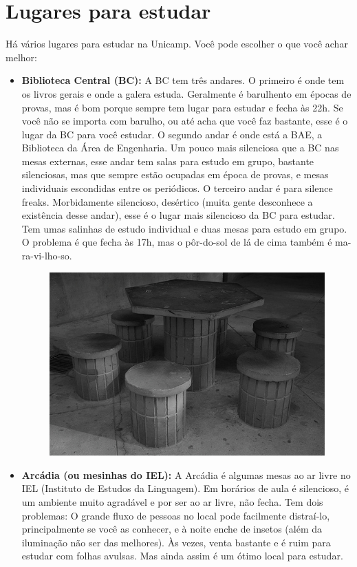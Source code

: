 
\section{Lugares para estudar}

Há vários lugares para estudar na Unicamp. Você pode escolher o que você achar
melhor:

\begin{itemize}
    \item  \textbf{Biblioteca Central (BC):} A BC tem três andares. O primeiro é
        onde tem os livros gerais e onde a galera estuda. Geralmente é
        barulhento em épocas de provas, mas é bom porque sempre tem lugar para
        estudar e fecha às 22h.  Se você não se importa com barulho, ou até acha
        que você faz bastante, esse é o lugar da BC para você estudar. O segundo
        andar é onde está a BAE, a Biblioteca da Área de Engenharia. Um pouco
        mais silenciosa que a BC nas mesas externas, esse andar tem salas para
        estudo em grupo, bastante silenciosas, mas que sempre estão ocupadas em
        época de provas, e mesas individuais escondidas entre os periódicos. O
        terceiro andar é para silence freaks. Morbidamente silencioso, desértico
        (muita gente desconhece a existência desse andar), esse é o lugar mais
        silencioso da BC para estudar. Tem umas salinhas de estudo individual e
        duas mesas para estudo em grupo. O problema é que fecha às 17h, mas o
        pôr-do-sol de lá de cima também é ma-ra-vi-lho-so.

        \begin{figure}[h!]
            \centering
            \includegraphics[width=.45\textwidth]{img/unicamp/mesinhas.jpg}
        \end{figure}

    \item  \textbf{Arcádia (ou mesinhas do IEL):} A Arcádia é algumas mesas ao
        ar livre no IEL (Instituto de Estudos da Linguagem). Em horários de aula
        é silencioso, é um ambiente muito agradável e por ser ao ar livre, não
        fecha.  Tem dois problemas: O grande fluxo de pessoas no local pode
        facilmente distraí-lo, principalmente se você as conhecer, e à noite
        enche de insetos (além da iluminação não ser das melhores). Às vezes,
        venta bastante e é ruim para estudar com folhas avulsas. Mas ainda assim
        é um ótimo local para estudar.


\end{itemize}
